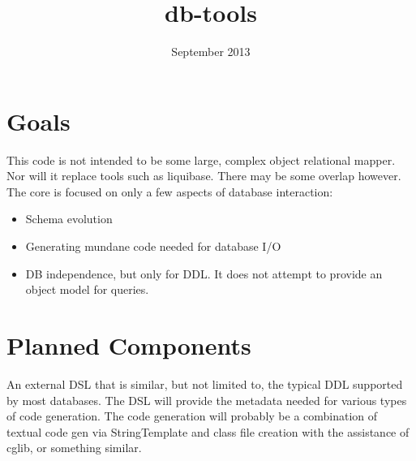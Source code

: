 \documentclass[10pt]{article}
\title{db-tools}
\date{September 2013}
\begin{document}
 \maketitle
\section{Goals}
This code is not intended to be some large, complex object relational mapper. 
Nor will it replace tools such as liquibase. There may be some overlap however. The core 
is focused on only a few aspects of database interaction: 
\begin{itemize}
	\item Schema evolution
	\item Generating mundane code needed for database I/O
        \item DB independence, but only for DDL. It does not attempt to provide an object model for queries.  
\end{itemize}

\section{Planned Components}
An external DSL that is similar, but not limited to, the typical DDL supported by most databases. 
The DSL will provide the metadata needed for various types of code generation. The code 
generation will probably be a combination of textual code gen via StringTemplate and class file 
creation with the assistance of cglib, or something similar.


\end{document}
